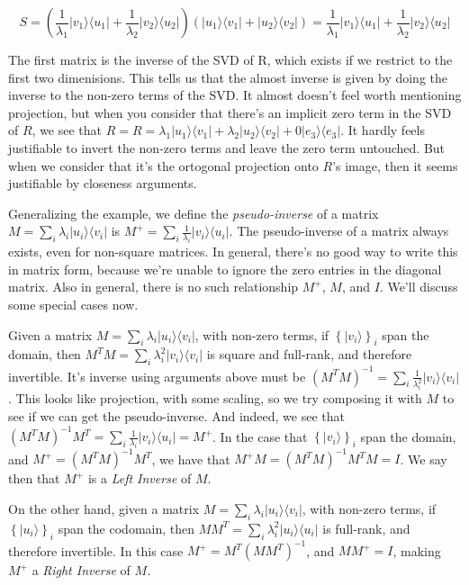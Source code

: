 \documentclass{amsbook}
\begin{document}
\begin{tcolorbox}[title=Example,colback=blue!5]
$$
S=\left(\frac{1}{\lambda_1}|v_1\rangle\langle u_1|+\frac{1}{\lambda_2}|v_2\rangle\langle u_2|\right)\left(|u_1\rangle\langle v_1|+|u_2\rangle\langle v_2|\right)=\frac{1}{\lambda_1}|v_1\rangle\langle u_1|+\frac{1}{\lambda_2}|v_2\rangle\langle u_2|
$$

The first matrix is the inverse of the SVD of R, which exists if we restrict to the first two dimenisions.  This tells us that the almost inverse is given by doing the inverse to the non-zero terms of the SVD.  It almost doesn't feel worth mentioning projection, but when you consider that there's an implicit zero term in the SVD of $R$, we see that $R=R=\lambda_1|u_1\rangle\langle v_1|+\lambda_2|u_2\rangle\langle v_2|+0|e_3\rangle\langle e_3|$.  It hardly feels justifiable to invert the non-zero terms and leave the zero term untouched.  But when we consider that it's the ortogonal projection onto $R$'s image, then it seems justifiable by closeness arguments.
\end{tcolorbox}

Generalizing the example, we define the {\em pseudo-inverse} of a matrix $M=\sum_i\lambda_i|u_i\rangle\langle v_i|$ is $M^+=\sum_i\frac{1}{\lambda_i}|v_i\rangle\langle u_i|$.  The pseudo-inverse of a matrix always exists, even for non-square matrices.  In general, there's no good way to write this in matrix form, because we're unable to ignore the zero entries in the diagonal matrix.  Also in general, there is no such relationship $M^+$, $M$, and $I$.  We'll discuss some special cases now.

Given a matrix $M=\sum_i\lambda_i|u_i\rangle\langle v_i|$, with non-zero terms, if $\left\{|v_i\rangle\right\}_i$ span the domain, then $M^TM=\sum_i\lambda_i^2|v_i\rangle\langle v_i|$ is square and full-rank, and therefore invertible.  It's inverse using arguments above must be $\left(M^TM\right)^{-1}=\sum_i\frac{1}{\lambda_i^2}|v_i\rangle\langle v_i|$.  This looks like projection, with some scaling, so we try composing it with $M$ to see if we can get the pseudo-inverse.  And indeed, we see that $\left(M^TM\right)^{-1}M^T=\sum_i\frac{1}{\lambda_i}|v_i\rangle\langle u_i|=M^+$.  In the case that $\left\{|v_i\rangle\right\}_i$ span the domain, and $M^+=\left(M^TM\right)^{-1}M^T$, we have that $M^+M=\left(M^TM\right)^{-1}M^TM=I$.  We say then that $M^+$ is a {\em Left Inverse} of $M$.

On the other hand, given a matrix $M=\sum_i\lambda_i|u_i\rangle\langle v_i|$, with non-zero terms, if $\left\{|u_i\rangle\right\}_i$ span the codomain, then $MM^T=\sum_i\lambda_i^2|u_i\rangle\langle u_i|$ is full-rank, and therefore invertible.  In this case $M^+=M^T\left(MM^T\right)^{-1}$, and $MM^+=I$, making $M^+$ a {\em Right Inverse} of $M$.
\end{document}
